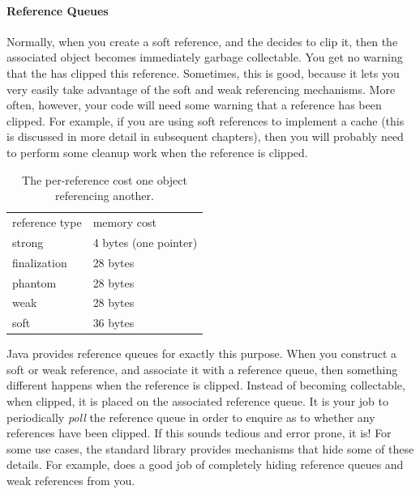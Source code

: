 
\paragraph{Reference Queues}
\label{sec:reference-queues}
Normally, when you create a soft reference, and the \jre decides to clip it,
then the associated  object becomes immediately garbage
collectable. You get no warning that the \jre has clipped this reference.
Sometimes, this is good, because it lets you very easily take advantage of the
soft and weak referencing mechanisms. More often, however, your code will need
some warning that a reference has been clipped. For example, if you are using
soft references to implement a cache (this is discussed in more detail in
subsequent chapters), then you will probably need to perform some cleanup work
when the reference is clipped.


\begin{table}
\centering
	\begin{tabular}{ll}
		\toprule
		reference type & memory cost \\
        \cmidrule(r){1-1} \cmidrule(l){2-2}		
		strong         & 4 bytes (one pointer) \\
		finalization   & 28 bytes \\
        phantom        & 28 bytes \\ 
		weak           & 28 bytes \\
		soft           & 36 bytes \\
		\bottomrule
	\end{tabular}
	\caption{The per-reference cost one object
	referencing another.}
	\label{tab:reference-costs}
\end{table}
Java provides reference queues for exactly this purpose. When you construct a
soft or weak reference, and associate it with a reference queue, then something
different happens when the reference is clipped. Instead of becoming
collectable, when clipped, it is placed on the associated reference queue. It is
your job to periodically \emph{poll} the reference queue in order to enquire as
to whether any references have been clipped. If this sounds tedious and error
prone, it is! For some use
cases, the standard library provides mechanisms that hide some of these details.
For example,  does a good job of completely hiding reference
queues and weak references from you.


